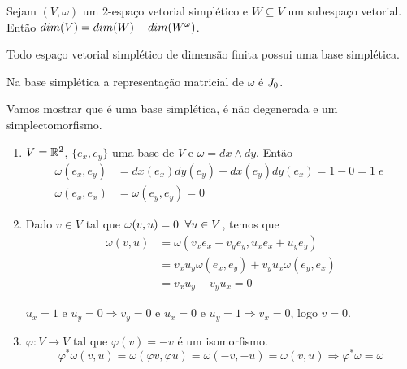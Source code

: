 \documentclass{beamer}
\begin{document}
	\begin{frame}
		
		\begin{proposicao}
			Sejam $(V,\omega)$ um 2-espaço vetorial simplético e $W \subseteq V$ um subespaço vetorial. Então $dim(V) = dim(W) + dim(W^{\omega})$.
		\end{proposicao}
		
		\pause
		\begin{teorema}
			Todo espaço vetorial simplético de dimensão finita possui uma base simplética.
		\end{teorema}
		
		\begin{observacao}
			Na base simplética a representação matricial de $\omega$ é $J_{0}$.
		\end{observacao}
	\end{frame}
	
	\begin{frame}
		\begin{tiny}
			Vamos mostrar que é uma base simplética, é não degenerada e um simplectomorfismo.
		\end{tiny}
		\begin{exemplo}
			\begin{enumerate}
				\item $V = \mathbb{R}^{2}$, $\{e_{x}, e_{y}\}$ uma base de $V$ e $\omega=dx \wedge dy$. Então 
				$$
				\begin{aligned}
					\omega(e_{x}, e_{y}) &=dx(e_{x}) dy(e_{y}) - dx(e_{y}) dy(e_{x}) = 1-0= 1 \; e\; 
					\\
					\omega(e_{x}, e_{x}) &= \omega(e_{y}, e_{y}) = 0	
				\end{aligned}
				$$ 
				
				\item Dado $v \in V$ tal que $\omega(v, u)=0 \;\;\forall u \in V$, temos que 
				$$
				\begin{aligned}
					\omega(v, u) &= \omega(v_{x}e_{x}+v_{y}e_{y}, u_{x}e_{x}+u_{y}e_{y})
					\\
					&=
					v_{x}u_{y}\omega(e_{x}, e_{y}) +v_{y}u_{x}\omega(e_{y}, e_{x})
					\\
					&= v_{x}u_{y} -v_{y}u_{x} = 0
				\end{aligned}
				$$
				
				$u_{x} = 1$ e $u_{y} = 0 \Rightarrow v_{y} = 0$ e $u_{x} = 0$ e $u_{y} = 1 \Rightarrow v_{x} = 0$, logo $v=0$.
				
				\item $\varphi:V \to V$ tal que $\varphi(v) = -v$ é um isomorfismo. 
				$$
				\varphi^{*}\omega(v, u) = \omega(\varphi v, \varphi u)=\omega(-v, -u)=\omega(v, u) \Rightarrow \varphi^{*}\omega = \omega$$
			\end{enumerate}			
		\end{exemplo}
	\end{frame}
	
\end{document}
